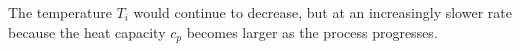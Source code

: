 The temperature \( T_i \) would continue to decrease, but at an increasingly slower rate because the heat capacity \( c_p \) becomes larger as the process progresses.